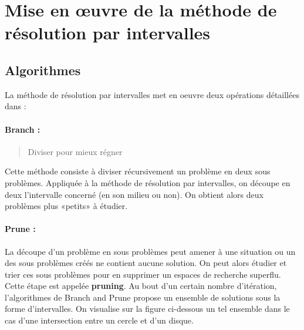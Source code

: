 \section{Mise en œuvre de la méthode de résolution par intervalles}



\subsection{Algorithmes}
La méthode de résolution par intervalles  met en oeuvre deux opérations détaillées dans \cite{Neumaier}: \\
\paragraph{Branch :}
\begin{quote}Diviser pour mieux régner\end{quote} Cette méthode consiste à diviser récursivement un problème en deux sous problèmes. Appliquée à la méthode de résolution par intervalles, on découpe en deux l'intervalle concerné (en son milieu ou non). On obtient alors deux problèmes plus «petits» à étudier.\clearpage

\paragraph{Prune :}
La découpe d'un problème en sous problèmes peut amener à une situation ou un des sous problèmes créés ne contient aucune solution. On peut alors étudier et trier ces sous problèmes pour en supprimer un espaces de recherche superflu. Cette étape est appelée \textbf{pruning}.
Au bout d'un certain nombre d'itération, l'algorithmes de Branch and Prune propose un ensemble de solutions sous la forme d'intervalles. On visualise sur la figure ci-dessous un tel ensemble dans le cas d'une intersection entre un cercle et d'un disque.

